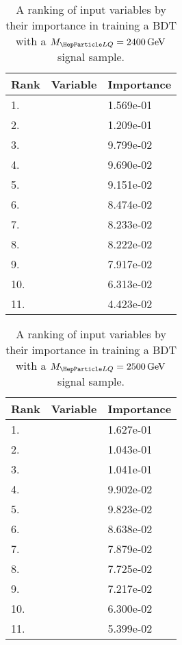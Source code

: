 \begin{table}[H]
	\caption{A ranking of input variables by their importance in training a BDT with a $\MLQ = \SI{2400}{GeV}$ signal sample.}
	\begin{center}
		\begin{tabular}{lll} \hline \hline
			Rank & Variable & Importance  \\ \hline
			1. & \MujTwo & 1.569e-01 \\
			2. & \MujOne & 1.209e-01 \\
			3. & \Muujj & 9.799e-02 \\
			4. & \ST & 9.690e-02 \\
			5. & \Muu & 9.151e-02 \\
			6. & \ptof{\PjTwo} & 8.474e-02 \\
			7. & \ptof{\PmuTwo} & 8.233e-02 \\
			8. & \DRof{\PmuOne+\PmuTwo}{\PjOne} & 8.222e-02 \\
			9. & \ptof{\PjOne} & 7.917e-02 \\
			10. & \ptof{\PmuOne} & 6.313e-02 \\
			11. & \MET & 4.423e-02 \\ \hline \hline
		\end{tabular}
		\label{tab:bdtRank2400}
	\end{center}
\end{table}

\begin{table}[H]
	\caption{A ranking of input variables by their importance in training a BDT with a $\MLQ = \SI{2500}{GeV}$ signal sample.}
	\begin{center}
		\begin{tabular}{lll} \hline \hline
			Rank & Variable & Importance  \\ \hline
			1. & \MujTwo & 1.627e-01 \\
			2. & \Muujj & 1.043e-01 \\
			3. & \DRof{\PmuOne+\PmuTwo}{\PjOne} & 1.041e-01 \\
			4. & \ptof{\PjTwo} & 9.902e-02 \\
			5. & \MujOne & 9.823e-02 \\
			6. & \Muu & 8.638e-02 \\
			7. & \ST & 7.879e-02 \\
			8. & \ptof{\PmuTwo} & 7.725e-02 \\
			9. & \ptof{\PjOne} & 7.217e-02 \\
			10. & \ptof{\PmuOne} & 6.300e-02 \\
			11. & \MET & 5.399e-02 \\ \hline \hline
		\end{tabular}
		\label{tab:bdtRank2500}
	\end{center}
\end{table}

